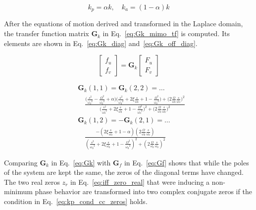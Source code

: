 \documentclass[10pt]{iopart}
\begin{document}
\begin{equation}
\label{eq:kp_alpha}
  k_p = \alpha k, \quad k_a = (1 - \alpha) k
\end{equation}

After the equations of motion derived and transformed in the Laplace domain, the transfer function matrix \(\mathbf{G}_k\) in Eq.~\eqref{eq:Gk_mimo_tf} is computed.
Its elements are shown in Eq.~\eqref{eq:Gk_diag} and~\eqref{eq:Gk_off_diag}.

\begin{equation}
\label{eq:Gk_mimo_tf}
  \begin{bmatrix} f_u \\ f_v \end{bmatrix} =
  \mathbf{G}_k
  \begin{bmatrix} F_u \\ F_v \end{bmatrix}
\end{equation}

\begin{subequations}
\label{eq:Gk}
\begin{align}
& \mathbf{G}_{k}(1,1) = \mathbf{G}_{k}(2,2) = \dots \nonumber \\
& \quad {\scriptstyle \frac{\big( \frac{s^2}{{\omega_0}^2} - \frac{\Omega^2}{{\omega_0}^2} + \alpha \big) \big( \frac{s^2}{{\omega_0}^2} + 2 \xi \frac{s}{\omega_0} + 1 - \frac{{\Omega}^2}{{\omega_0}^2} \big) + \big( 2 \frac{\Omega}{\omega_0} \frac{s}{\omega_0} \big)^2}{\big( \frac{s^2}{{\omega_0}^2} + 2 \xi \frac{s}{\omega_0} + 1 - \frac{{\Omega}^2}{{\omega_0}^2} \big)^2 + \big( 2 \frac{\Omega}{\omega_0} \frac{s}{\omega_0} \big)^2} } \label{eq:Gk_diag} \\
& \mathbf{G}_{k}(1,2) = -\mathbf{G}_{k}(2,1) = \dots \nonumber \\
& \quad {\scriptscriptstyle \frac{- \left( 2 \xi \frac{s}{\omega_0} + 1 - \alpha \right) \left( 2 \frac{\Omega}{\omega_0} \frac{s}{\omega_0} \right)}{\left( \frac{s^2}{{\omega_0}^2} + 2 \xi \frac{s}{\omega_0} + 1 - \frac{{\Omega}^2}{{\omega_0}^2} \right)^2 + \left( 2 \frac{\Omega}{\omega_0} \frac{s}{\omega_0} \right)^2} } \label{eq:Gk_off_diag}
\end{align}
\end{subequations}

Comparing \(\mathbf{G}_k\) in Eq.~\eqref{eq:Gk} with \(\mathbf{G}_f\) in Eq.~\eqref{eq:Gf} shows that while the poles of the system are kept the same, the zeros of the diagonal terms have changed.
The two real zeros \(z_r\) in Eq.~\eqref{eq:iff_zero_real} that were inducing a non-minimum phase behavior are transformed into two complex conjugate zeros if the condition in Eq.~\eqref{eq:kp_cond_cc_zeros} holds.
\end{document}
